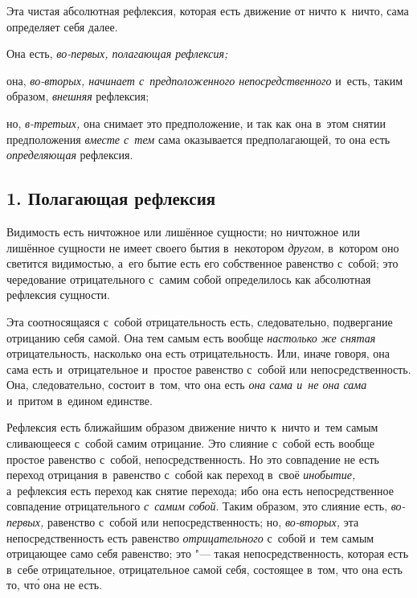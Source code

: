 Эта чистая абсолютная рефлексия, которая есть движение от ничто к~ничто,
сама определяет себя далее.

Она есть, {\em во-первых, полагающая рефлексия;}

она, {\em во-вторых, начинает с~предположенного непосредственного} и~есть,
таким образом, {\em внешняя} рефлексия;

но, {\em в-третьих,} она снимает это предположение, и
так как она в~этом снятии предположения {\em вместе с~тем}
сама оказывается предполагающей, то она есть {\em определяющая} рефлексия.

\subsection[1. Полагающая рефлексия]{1. Полагающая рефлексия}
Видимость есть ничтожное или лишённое сущности;
но ничтожное или лишённое сущности не имеет своего бытия в~некотором
{\em другом,} в~котором оно светится видимостью, а~его
бытие есть его собственное равенство с~собой; это чередование
отрицательного с~самим собой определилось как абсолютная рефлексия сущности.

Эта соотносящаяся с~собой отрицательность есть, следовательно, подвергание
отрицанию себя самой. Она тем самым есть вообще
{\em настолько же снятая} отрицательность, насколько
она есть отрицательность. Или, иначе говоря, она сама есть и~отрицательное
и~простое равенство с~собой или непосредственность. Она, следовательно,
состоит в~том, что она есть {\em она сама и~не она
сама} и~притом в~едином единстве.

Рефлексия есть ближайшим образом движение ничто к~ничто и~тем самым
сливающееся с~собой самим отрицание. Это слияние с~собой есть вообще
простое равенство с~собой, непосредственность. Но это совпадение не есть
переход отрицания в~равенство с~собой как переход в~своё
{\em инобытие,} а~рефлексия есть переход как снятие
перехода; ибо она есть непосредственное совпадение отрицательного
{\em с~самим собой}. Таким образом, это слияние есть,
{\em во-первых,} равенство с~собой или
непосредственность; но, {\em во-вторых,} эта
непосредственность есть равенство {\em отрицательного}
с~собой и~тем самым отрицающее само себя равенство; это "--- такая
непосредственность, которая есть в~себе отрицательное, отрицательное самой
себя, состоящее в~том, что она есть то, чт\'{о} она не есть.

